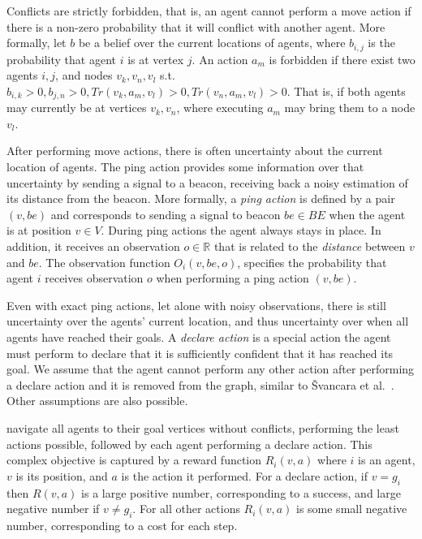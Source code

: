 \documentclass[letterpaper]{article} %
\newcommand{\shortcite}[1]{{\cite{#1}}}
\begin{document}
Conflicts are strictly forbidden, that is, an agent cannot perform a move action if there is a non-zero probability that it will conflict with another agent.  More formally, let $b$ be a belief over the current locations of agents, where $b_{i,j}$ is the probability that agent $i$ is at vertex $j$.
An action $a_m$ is forbidden if there exist two agents $i,j$, and nodes $v_{k},v_{n},v_{l}$ s.t.
$b_{i,k}>0, b_{j,n}>0, Tr(v_k,a_m,v_l)>0, Tr(v_n,a_m,v_l)>0 $. That is, if both agents may currently be at vertices $v_k,v_n$, where executing $a_m$ may bring them to a node $v_l$.



 After performing move actions, there is often uncertainty about the current location of agents. The ping action provides some information over that uncertainty by sending a signal to a beacon, receiving back a noisy estimation of its distance from the beacon. 
More formally, a \emph{ping action} is defined by a pair $(v,be)$ and corresponds to sending a signal to beacon $be\in BE$ when the agent is at position $v\in V$. During ping actions the agent always stays in place. 
In addition, it receives an observation $o\in\mathbb{R}$ that is related to the \emph{distance} between $v$ and $be$. The  observation function $O_i(v,be,o)$, specifies the probability that agent $i$ receives observation $o$ when performing a ping action $(v,be)$. 

Even with exact ping actions, let alone with noisy observations, there is still uncertainty over the agents' current location, and thus uncertainty over when all agents have reached their goals. 
A \emph{declare action} is a special action the agent must perform to declare that it is sufficiently confident that it has reached its goal. We assume that the agent cannot perform any other action after performing a declare action and it is removed from the graph, similar to  {\v{S}}vancara et al.~\shortcite{vsvancara2019online}. Other assumptions are also possible. 

navigate all agents to their goal vertices without conflicts, performing the least actions possible, followed by each agent performing a declare action.  
This complex objective is captured by a reward function $R_i(v,a)$ where $i$ is an agent, $v$ is its position, and $a$ is the action it performed. 
For a declare action, if $v=g_i$ then $R(v,a)$ is a large positive number, corresponding to a success, and large negative number if $v \neq g_i$.  For all other actions $R_i(v,a)$ is some small negative number, corresponding to a cost for each step. 
\end{document}
